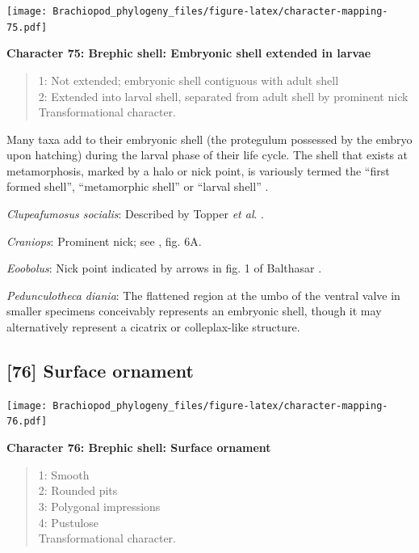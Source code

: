 \documentclass[openany]{book}
\theoremstyle{definition}
\theoremstyle{definition}
\theoremstyle{definition}
\theoremstyle{remark}
\begin{document}
\texttt{[image: Brachiopod\_phylogeny\_files/figure-latex/character-mapping-75.pdf]}

\textbf{Character 75: Brephic shell: Embryonic shell extended in larvae}

\begin{quote}
1: Not extended; embryonic shell contiguous with adult shell\\
2: Extended into larval shell, separated from adult shell by prominent
nick\\
Transformational character.
\end{quote}

Many taxa add to their embryonic shell (the protegulum possessed by the
embryo upon hatching) during the larval phase of their life cycle. The
shell that exists at metamorphosis, marked by a halo or nick point, is
variously termed the ``first formed shell'', ``metamorphic shell'' or
``larval shell'' \citep{Bassett2017Earliestontogeny}.

\hypertarget{Clupeafumosus_socialis-coding-75}{}
\emph{Clupeafumosus socialis}: Described by Topper \emph{et al}.
\citeyearpar{Topper2013Reappraisalof}.

\hypertarget{Craniops-coding-75}{}
\emph{Craniops}: Prominent nick; see \citet{Freeman1999Changesin}, fig.
6A.

\hypertarget{Eoobolus-coding-75}{}
\emph{Eoobolus}: Nick point indicated by arrows in fig. 1 of Balthasar
\citeyearpar{Balthasar2009Thebrachiopod}.

\hypertarget{Pedunculotheca_diania-coding-75}{}
\emph{Pedunculotheca diania}: The flattened region at the umbo of the
ventral valve in smaller specimens conceivably represents an embryonic
shell, though it may alternatively represent a cicatrix or
colleplax-like structure.

\subsection*{{[}76{]} Surface ornament}\label{surface-ornament}

\texttt{[image: Brachiopod\_phylogeny\_files/figure-latex/character-mapping-76.pdf]}

\textbf{Character 76: Brephic shell: Surface ornament}

\begin{quote}
1: Smooth\\
2: Rounded pits\\
3: Polygonal impressions\\
4: Pustulose\\
Transformational character.
\end{quote}
\end{document}
